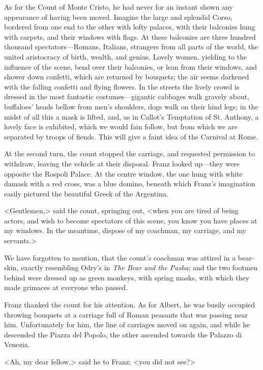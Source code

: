  As for the Count of Monte Cristo, he had never for an instant shown any appearance of having been moved. Imagine the large and splendid Corso, bordered from one end to the other with lofty palaces, with their balconies hung with carpets, and their windows with flags. At these balconies are three hundred thousand spectators—Romans, Italians, strangers from all parts of the world, the united aristocracy of birth, wealth, and genius. Lovely women, yielding to the influence of the scene, bend over their balconies, or lean from their windows, and shower down confetti, which are returned by bouquets; the air seems darkened with the falling confetti and flying flowers. In the streets the lively crowd is dressed in the most fantastic costumes—gigantic cabbages walk gravely about, buffaloes' heads bellow from men's shoulders, dogs walk on their hind legs; in the midst of all this a mask is lifted, and, as in Callot's Temptation of St. Anthony, a lovely face is exhibited, which we would fain follow, but from which we are separated by troops of fiends. This will give a faint idea of the Carnival at Rome. 

 At the second turn, the count stopped the carriage, and requested permission to withdraw, leaving the vehicle at their disposal. Franz looked up—they were opposite the Rospoli Palace. At the centre window, the one hung with white damask with a red cross, was a blue domino, beneath which Franz's imagination easily pictured the beautiful Greek of the Argentina. 

 <Gentlemen,> said the count, springing out, <when you are tired of being actors, and wish to become spectators of this scene, you know you have places at my windows. In the meantime, dispose of my coachman, my carriage, and my servants.> 

 We have forgotten to mention, that the count's coachman was attired in a bear-skin, exactly resembling Odry's in \textit{The Bear and the Pasha}; and the two footmen behind were dressed up as green monkeys, with spring masks, with which they made grimaces at everyone who passed. 

 Franz thanked the count for his attention. As for Albert, he was busily occupied throwing bouquets at a carriage full of Roman peasants that was passing near him. Unfortunately for him, the line of carriages moved on again, and while he descended the Piazza del Popolo, the other ascended towards the Palazzo di Venezia. 

 <Ah, my dear fellow,> said he to Franz; <you did not see?> 

